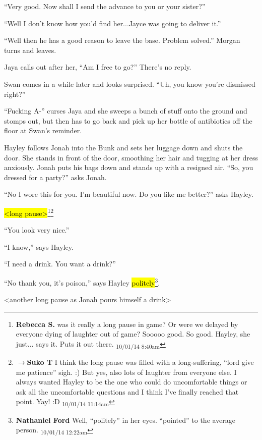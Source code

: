 ``Very good.  Now shall I send the advance to you or your sister?''

``Well I don't know how you'd find her...Jayce was going to deliver it.''

``Well then he has a good reason to leave the base.  Problem solved.'' Morgan turns and leaves.

Jaya calls out after her, ``Am I free to go?''  There's no reply.



Swan comes in a while later and looks surprised.  ``Uh, you know you're dismissed right?''

``Fucking A-'' curses Jaya and she sweeps a bunch of stuff onto the ground and stomps out, but then has to go back and pick up her bottle of antibiotics off the floor at Swan's reminder.





Hayley follows Jonah into the Bunk and sets her luggage down and shuts the door.  She stands in front of the door, smoothing her hair and tugging at her dress anxiously.  Jonah puts his bags down and stands up with a resigned air.  ``So, you dressed for a party?'' asks Jonah.

``No I wore this for you.  I'm beautiful now.  Do you like me better?'' asks Hayley.

\hl{\textless long pause\textgreater }\footnote{\textbf{Rebecca S. }was it really a long pause in game?  Or were we delayed by everyone dying of laughter out of game?  Sooooo good. So good.  Hayley, she just... says it. Puts it out there. \textsubscript{10/01/14 8:40am}}\footnote{$\rightarrow$\textbf{Suko T }I think the long pause was filled with a long-suffering, ``lord give me patience'' sigh. :)  But yes, also lots of laughter from everyone else.  I always wanted Hayley to be the one who could do uncomfortable things or ask all the uncomfortable questions and I think I've finally reached that point.  Yay! :D \textsubscript{10/01/14 11:14am}}

``You look very nice.''

``I know,'' says Hayley.

``I need a drink.  You want a drink?''

``No thank you, it's poison,'' says Hayley \hl{politely}\footnote{\textbf{Nathaniel Ford }Well, ``politely'' in her eyes. ``pointed'' to the average person. \textsubscript{10/01/14 12:22am}}.

\textless another long pause as Jonah pours himself a drink\textgreater 

